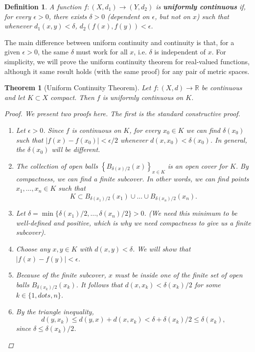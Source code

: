 \documentclass[12pt]{amsart}         %
\newtheorem{definition}{Definition}[section]
\newtheorem{theorem}{Theorem}[section]
\theoremstyle{remark}
\newcommand{\R}{\mathbb{R}}
\begin{document}
\begin{definition}
A function $f: (X, d_1) \rightarrow (Y, d_2)$ is \textbf{uniformly continuous} if, for every $\epsilon > 0$, there exists $\delta > 0$ (dependent on $\epsilon$, but not on $x$) such that whenever $d_1(x, y) < \delta$, $d_2(f(x), f(y)) < \epsilon$.
\end{definition}
The main difference between uniform continuity and continuity is that, for a given $\epsilon > 0$, the same $\delta$ must work for all $x$, i.e. $\delta$ is independent of $x$. For simplicity, we will prove the uniform continuity theorem for real-valued functions, although it same result holds (with the same proof) for any pair of metric spaces.

\begin{theorem}[Uniform Continuity Theorem]
Let $f: (X, d) \rightarrow \R$ be continuous and let $K \subset X$ compact. Then $f$ is uniformly continuous on $K$.
\begin{proof}
We present two proofs here. The first is the standard constructive proof.
\begin{enumerate}
    \item Let $\epsilon > 0$. Since $f$ is continuous on $K$, for every $x_0 \in K$ we can find $\delta(x_0)$ such that $|f(x) - f(x_0)| < \epsilon/2$ whenever $d(x, x_0) < \delta(x_0)$. In general, the $\delta(x_0)$ will be different.
    \item The collection of open balls $\left\{ B_{\delta(x)/2}(x) \right\}_{x \in K}$ is an open cover for $K$. By compactness, we can find a finite subcover. In other words, we can find points $x_1, \dots, x_n \in K$ such that
    \[
    K \subset B_{\delta(x_1)/2}(x_1) \cup \dots \cup B_{\delta(x_n)/2}(x_n).
    \]
    \item Let $\delta = \min\{ \delta(x_1)/2, \dots, \delta(x_n)/2 \} > 0$. (We need this minimum to be well-defined and positive, which is why we need compactness to give us a finite subcover).
    \item Choose any $x, y \in K$ with $d(x, y) < \delta$. We will show that $|f(x) - f(y)| < \epsilon$.
    \item Because of the finite subcover, $x$ must be inside one of the finite set of open balls $B_{\delta(x_k)/2}(x_k)$. It follows that $d(x, x_k) < \delta(x_k)/2$ for some $k \in \{1, dots, n\}$.
    \item By the triangle inequality,
    \[
    d(y, x_k) \leq d(y, x) + d(x, x_k) < \delta + \delta(x_k)/2 \leq \delta(x_k),
    \]
    since $\delta \leq \delta(x_k)/2$.

\end{enumerate}
\end{proof}
\end{theorem}
\end{document}
